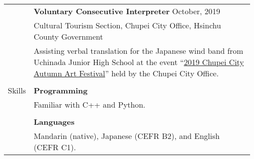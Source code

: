 \documentclass[letterpaper, 11pt]{article}
\begin{document}
\begin{center}
\begin{longtable}{p{0.74in}p{5.95in}}
        & \textbf{Voluntary Consecutive Interpreter} \hfill October, 2019\\
        & Cultural Tourism Section, Chupei City Office, Hsinchu County Government\\
        & Assisting verbal translation for the Japanese wind band from Uchinada Junior High School at the event ``\href{https://www.zhubei.gov.tw/travel/p2_1_2.php?bigact_id=111}{2019 Chupei City Autumn Art Festival}'' held by the Chupei City Office.\\
        & \\
        
        
        {\textcolor{OliveGreen}{Skills}} 
        & \textbf{Programming}\\
        & Familiar with C++ and Python. \\
        & \\
        
        & \textbf{Languages} \\
        & Mandarin (native), Japanese (CEFR B2), and English (CEFR C1). \\
        
        
    \end{longtable}
\end{center}
\end{document}
